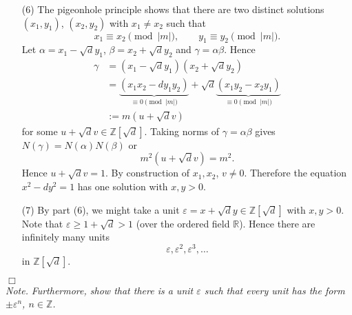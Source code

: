 \documentclass{article}
\begin{document}
\begin{enumerate}
\item[(6)]
  The pigeonhole principle shows that there are two distinct solutions $(x_1,y_1)$, $(x_2,y_2)$
  with $x_1 \neq x_2$ such that
  \[
    x_1 \equiv x_2 \pmod{|m|},
    \qquad 
    y_1 \equiv y_2 \pmod{|m|}.
  \]
  Let $\alpha = x_1 - \sqrt{d} y_1$, $\beta = x_2 + \sqrt{d} y_2$ and $\gamma = \alpha\beta$.
  Hence
  \begin{align*}
    \gamma
    &= (x_1 - \sqrt{d} y_1)(x_2 + \sqrt{d} y_2) \\
    &= \underbrace{(x_1 x_2 - d y_1 y_2)}_{\equiv 0 \pmod{|m|}}
        + \sqrt{d}\underbrace{(x_1 y_2 - x_2 y_1)}_{\equiv 0 \pmod{|m|}} \\
    &:= m(u + \sqrt{d} v)
  \end{align*}
  for some $u + \sqrt{d} v \in \mathbb{Z}[\sqrt{d}]$.
  Taking norms of $\gamma = \alpha\beta$ gives $N(\gamma) = N(\alpha)N(\beta)$ or
  \[
    m^2 (u + \sqrt{d} v) = m^2.
  \]
  Hence $u + \sqrt{d} v = 1$.
  By construction of $x_1, x_2$, $v \neq 0$.
  Therefore the equation $x^2 - dy^2 = 1$ has one solution with $x, y > 0$.

\item[(7)]
  By part (6), we might take a unit $\varepsilon = x + \sqrt{d}y \in \mathbb{Z}[\sqrt{d}]$
  with $x, y > 0$.
  Note that $\varepsilon \geq 1 + \sqrt{d} > 1$ (over the ordered field $\mathbb{R}$).
  Hence there are infinitely many units
  \[
    \varepsilon, \varepsilon^2, \varepsilon^3, \ldots
  \]
  in $\mathbb{Z}[\sqrt{d}]$.
\end{enumerate}
$\Box$ \\



\emph{Note.}
  \emph{Furthermore, show that there is a unit $\varepsilon$ such that every unit has the form
  $\pm \varepsilon^n$, $n \in \mathbb{Z}$.} \\
\end{document}
